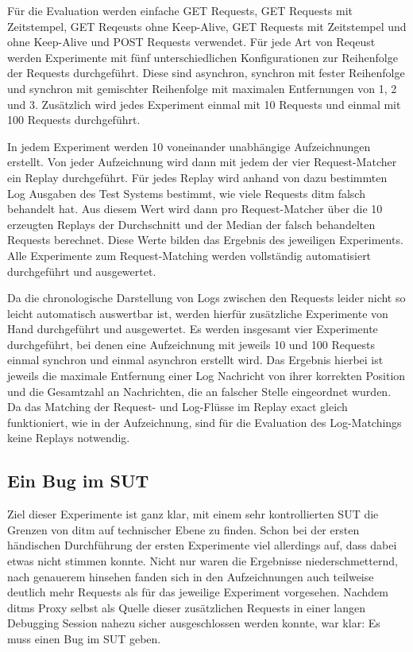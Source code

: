 \documentclass[a4paper]{report}
\begin{document}
Für die Evaluation werden einfache GET Requests, GET Requests mit Zeitstempel, GET Reqeusts ohne Keep-Alive, GET Requests mit
Zeitstempel und ohne Keep-Alive und POST Requests verwendet. Für jede Art von Reqeust werden Experimente mit fünf unterschiedlichen
Konfigurationen zur Reihenfolge der Requests durchgeführt. Diese sind asynchron, synchron mit fester Reihenfolge und synchron mit gemischter
Reihenfolge mit maximalen Entfernungen von 1, 2 und 3. Zusätzlich wird jedes Experiment einmal mit 10 Requests und einmal mit 100 Requests
durchgeführt.

In jedem Experiment werden 10 voneinander unabhängige Aufzeichnungen erstellt. Von jeder Aufzeichnung wird dann mit jedem der vier
Request-Matcher ein Replay durchgeführt. Für jedes Replay wird anhand von dazu bestimmten Log Ausgaben des Test Systems bestimmt,
wie viele Requests ditm falsch behandelt hat. Aus diesem Wert wird dann pro Request-Matcher über die 10 erzeugten Replays der Durchschnitt
und der Median der falsch behandelten Requests berechnet. Diese Werte bilden das Ergebnis des jeweiligen Experiments.
Alle Experimente zum Request-Matching werden vollständig automatisiert durchgeführt und ausgewertet. %

Da die chronologische Darstellung von Logs zwischen den Requests leider nicht so leicht automatisch auswertbar ist, werden hierfür
zusätzliche Experimente von Hand durchgeführt und ausgewertet. Es werden insgesamt vier Experimente durchgeführt, bei denen eine
Aufzeichnung mit jeweils 10 und 100 Requests einmal synchron und einmal asynchron erstellt wird. Das Ergebnis hierbei ist jeweils
die maximale Entfernung einer Log Nachricht von ihrer korrekten Position und die Gesamtzahl an Nachrichten, die an falscher Stelle
eingeordnet wurden. Da das Matching der Request- und Log-Flüsse im Replay exact gleich funktioniert, wie in der Aufzeichnung, sind
für die Evaluation des Log-Matchings keine Replays notwendig.

\subsection{Ein Bug im SUT}
Ziel dieser Experimente ist ganz klar, mit einem sehr kontrollierten SUT die Grenzen von ditm auf technischer Ebene zu finden.
Schon bei der ersten händischen Durchführung der ersten Experimente viel allerdings auf, dass dabei etwas nicht stimmen konnte.
Nicht nur waren die Ergebnisse niederschmetternd, nach genauerem hinsehen fanden sich in den Aufzeichnungen auch teilweise deutlich
mehr Requests als für das jeweilige Experiment vorgesehen. Nachdem ditms Proxy selbst als Quelle dieser zusätzlichen Requests
in einer langen Debugging Session nahezu sicher ausgeschlossen werden konnte, war klar: Es muss einen Bug im SUT geben.
\end{document}
